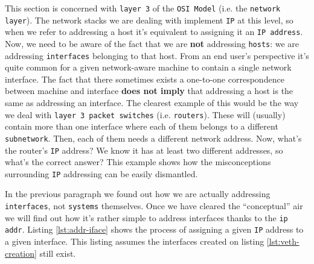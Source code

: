         This section is concerned with \texttt{layer 3} of the \texttt{OSI Model} (i.e. the \texttt{network layer}). The network stacks we are dealing with implement \texttt{IP} at this level, so when we refer to addressing a host it's equivalent to assigning it an \texttt{IP address}. Now, we need to be aware of the fact that we are \textbf{not} addressing \texttt{hosts}: we are addressing \texttt{interfaces} belonging to that host. From an end user's perspective it's quite common for a given network-aware machine to contain a single network interface. The fact that there sometimes exists a one-to-one correspondence between machine and interface \textbf{does not imply} that addressing a host is the same as addressing an interface. The clearest example of this would be the way we deal with \texttt{layer 3 packet switches} (i.e. \texttt{routers}). These will (usually) contain more than one interface where each of them belongs to a different \texttt{subnetwork}. Then, each of them needs a different network address. Now, what's the router's \texttt{IP} address? We know it has at least two different addresses, so what's the correct answer? This example shows how the misconceptions surrounding \texttt{IP} addressing can be easily dismantled.

        In the previous paragraph we found out how we are actually addressing \texttt{interfaces}, not \texttt{systems} themselves. Once we have cleared the ``conceptual'' air we will find out how it's rather simple to address interfaces thanks to the \texttt{ip addr}. Listing \ref{lst:addr-iface} shows the process of assigning a given \texttt{IP} address to a given interface. This listing assumes the interfaces created on listing \ref{lst:veth-creation} still exist.

